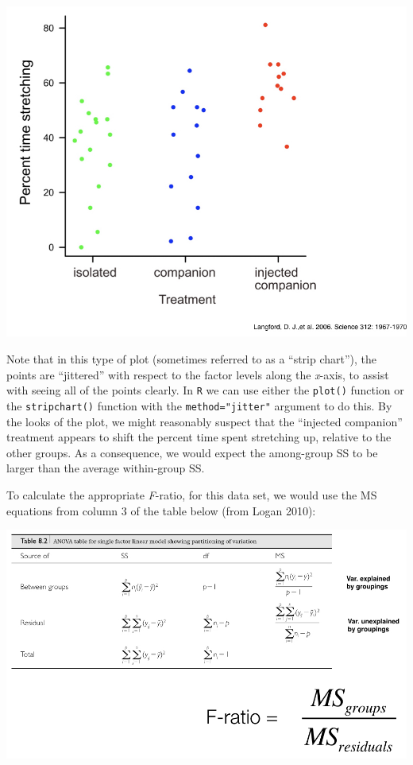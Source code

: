 \documentclass[]{book}
\begin{document}
\begin{center}\includegraphics[width=0.8\linewidth]{images/images_5b.014} \end{center}

Note that in this type of plot (sometimes referred to as a ``strip chart''), the points are ``jittered'' with respect to the factor levels along the \emph{x}-axis, to assist with seeing all of the points clearly. In \texttt{R} we can use either the \texttt{plot()} function or the \texttt{stripchart()} function with the \texttt{method="jitter"} argument to do this. By the looks of the plot, we might reasonably suspect that the ``injected companion'' treatment appears to shift the percent time spent stretching up, relative to the other groups. As a consequence, we would expect the among-group SS to be larger than the average within-group SS.

To calculate the appropriate \emph{F}-ratio, for this data set, we would use the MS equations from column 3 of the table below (from Logan 2010):

\begin{center}\includegraphics[width=1\linewidth]{images/images_5b.018} \end{center}
\end{document}
